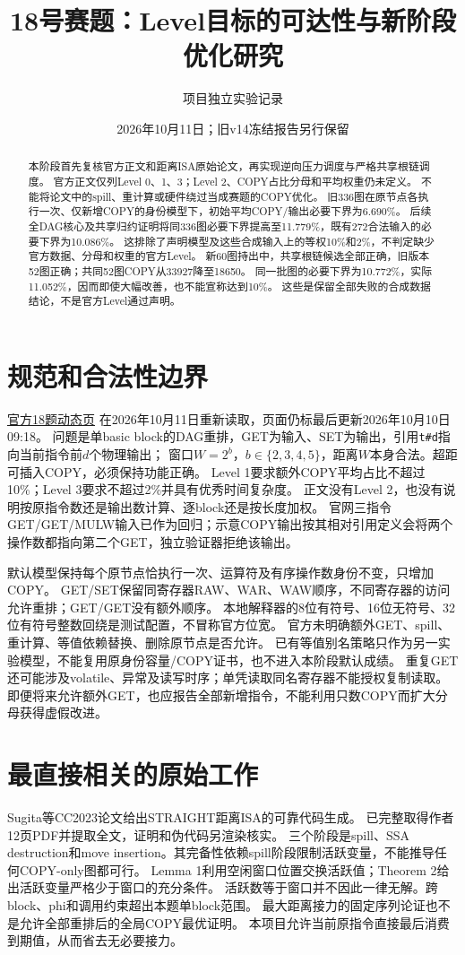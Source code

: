 \documentclass[UTF8,11pt,a4paper]{ctexart}
\title{18号赛题：Level目标的可达性与新阶段优化研究}
\author{项目独立实验记录}
\date{2026年10月11日；旧v14冻结报告另行保留}
\begin{document}
\maketitle
\begin{abstract}
本阶段首先复核官方正文和距离ISA原始论文，再实现逆向压力调度与严格共享根链调度。
官方正文仅列Level 0、1、3；Level 2、COPY占比分母和平均权重仍未定义。
不能将论文中的spill、重计算或硬件绕过当成赛题的COPY优化。
旧336图在原节点各执行一次、仅新增COPY的身份模型下，初始平均COPY/输出必要下界为6.690\%。
后续全DAG核心及共享归约证明将同336图必要下界提高至11.779\%，既有272合法输入的必要下界为10.086\%。
这排除了声明模型及这些合成输入上的等权10\%和2\%，不判定缺少官方数据、分母和权重的官方Level。
新60图持出中，共享根链候选全部正确，旧版本52图正确；共同52图COPY从33927降至18650。
同一批图的必要下界为10.772\%，实际11.052\%，因而即使大幅改善，也不能宣称达到10\%。
这些是保留全部失败的合成数据结论，不是官方Level通过声明。
\end{abstract}

\section{规范和合法性边界}
\href{https://www.chaspark.com/\#/races/competitions/1326690549003280384}{官方18题动态页}
在2026年10月11日重新读取，页面仍标最后更新2026年10月10日09:18。
问题是单basic block的DAG重排，GET为输入、SET为输出，引用\texttt{t\#d}指向当前指令前$d$个物理输出；
窗口$W=2^b$，$b\in\{2,3,4,5\}$，距离$W$本身合法。超距可插入COPY，必须保持功能正确。
Level 1要求额外COPY平均占比不超过10\%；Level 3要求不超过2\%并具有优秀时间复杂度。
正文没有Level 2，也没有说明按原指令数还是输出数计算、逐block还是按长度加权。
官网三指令GET/GET/MULW输入已作为回归；示意COPY输出按其相对引用定义会将两个操作数都指向第二个GET，独立验证器拒绝该输出。

默认模型保持每个原节点恰执行一次、运算符及有序操作数身份不变，只增加COPY。
GET/SET保留同寄存器RAW、WAR、WAW顺序，不同寄存器的访问允许重排；GET/GET没有额外顺序。
本地解释器的8位有符号、16位无符号、32位有符号整数回绕是测试配置，不冒称官方位宽。
官方未明确额外GET、spill、重计算、等值依赖替换、删除原节点是否允许。
已有等值别名策略只作为另一实验模型，不能复用原身份容量/COPY证书，也不进入本阶段默认成绩。
重复GET还可能涉及volatile、异常及读写时序；单凭读取同名寄存器不能授权复制读取。
即便将来允许额外GET，也应报告全部新增指令，不能利用只数COPY而扩大分母获得虚假改进。

\section{最直接相关的原始工作}
Sugita等CC2023论文\cite{sugita}给出STRAIGHT距离ISA的可靠代码生成。
已完整取得作者12页PDF并提取全文，证明和伪代码另渲染核实。
三个阶段是spill、SSA destruction和move insertion。其完备性依赖spill阶段限制活跃变量，不能推导任何COPY-only图都可行。
Lemma 1利用空闲窗口位置交换活跃值；Theorem 2给出活跃变量严格少于窗口的充分条件。
活跃数等于窗口并不因此一律无解。跨block、phi和调用约束超出本题单block范围。
最大距离接力的固定序列论证也不是允许全部重排后的全局COPY最优证明。
本项目允许当前原指令直接最后消费到期值，从而省去无必要接力。
\end{document}

